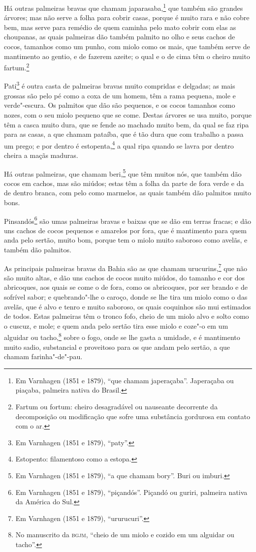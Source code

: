 Há outras palmeiras bravas que chamam japarasaba,\footnote{ Em Varnhagen (1851 e 1879),
``que chamam japeraçaba''. Japeraçaba ou piaçaba, palmeira nativa do Brasil.} que também
são grandes árvores; mas não serve a folha para cobrir casas, porque é muito rara e não
cobre bem, mas serve para remédio de quem caminha pelo mato cobrir com elas as choupanas,
as quais palmeiras dão também palmito no olho e seus cachos de cocos, tamanhos como um
punho, com miolo como os mais, que também serve de mantimento ao gentio, e de fazerem
azeite; o qual e o de cima têm o cheiro muito fartum.\footnote{ Fartum ou fortum: cheiro
desagradável ou nauseante decorrente da decomposição ou modificação que sofre uma
substância gordurosa em contato com o ar.}

Pati\footnote{ Em Varnhagen (1851 e 1879), ``paty''.} é outra casta de palmeiras bravas
muito compridas e delgadas; as mais grossas são pelo pé como a coxa de um homem, têm a
rama pequena, mole e verde"-escura. Os palmitos que dão são pequenos, e os cocos tamanhos
como nozes, com o seu miolo pequeno que se come. Destas árvores se usa muito, porque têm a
casca muito dura, que se fende ao machado muito bem, da qual se faz ripa para as casas, a
que chamam pataíba, que é tão dura que com trabalho a passa um prego; e por dentro é
estopenta,\footnote{ Estopento: filamentoso como a estopa.} a qual ripa quando se lavra
por dentro cheira a maçãs maduras.


Há outras palmeiras, que chamam beri,\footnote{ Em Varnhagen (1851 e 1879), ``a que chamam
bory''. Buri ou imburi.} que têm muitos nós, que também dão cocos em cachos, mas são
miúdos; estas têm a folha da parte de fora verde e da de dentro branca, com pelo como
marmelos, as quais também dão palmitos muito bons.

Pinsandós\footnote{ Em Varnhagen (1851 e 1879), ``piçandós''. Piçandó ou guriri, palmeira
nativa da América do Sul.} são umas palmeiras bravas e baixas que se dão em terras fracas;
e dão uns cachos de cocos pequenos e amarelos por fora, que é mantimento para quem anda
pelo sertão, muito bom, porque tem o miolo muito saboroso como avelãs, e também dão
palmitos.

As principais palmeiras bravas da Bahia são as que chamam urucurins,\footnote{ Em
Varnhagen (1851 e 1879), ``ururucuri''.} que não são muito altas, e dão uns cachos de
cocos muito miúdos, do tamanho e cor dos abricoques, aos quais se come o de fora, como os
abricoques, por ser brando e de sofrível sabor; e quebrando"-lhe o caroço, donde se lhe
tira um miolo como o das avelãs, que é alvo e tenro e muito saboroso, os quais coquinhos
são mui estimados de todos. Estas palmeiras têm o tronco fofo, cheio de um miolo alvo e
solto como o cuscuz, e mole; e quem anda pelo sertão tira esse miolo e coze"-o em um
alguidar ou tacho,\footnote{ No manuscrito da \textsc{bgjm}, ``cheio de um miolo e cozido
em um alguidar ou tacho''.} sobre o fogo, onde se lhe gasta a umidade, e é mantimento
muito sadio, substancial e proveitoso para os que andam pelo sertão, a que chamam
farinha"-de"-pau.

